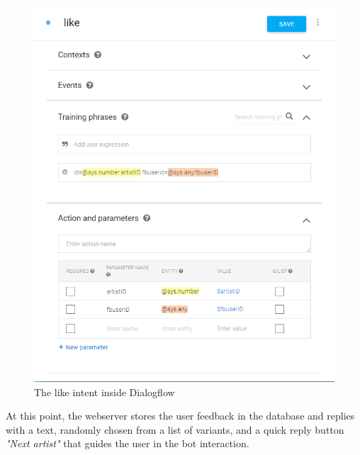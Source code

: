 \documentclass[b5paper,10pt,twoside,cucitura]{toptesi}
\begin{document}
\begin{figure}[ht]
\centering
\includegraphics[scale=0.5]{DF_like_intent.png}
\caption{The like intent inside Dialogflow}
\end{figure}

\pagebreak

\noindent
At this point, the webserver stores the user feedback in the database and replies with a text, randomly chosen from a list of variants, and a quick reply button \textit{"Next artist"} that guides the user in the bot interaction. 
\end{document}
